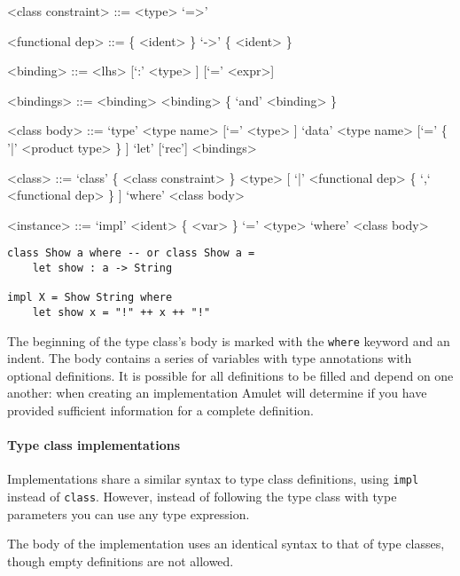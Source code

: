 \begin{grammar}
<class constraint> ::= <type> `=>'

<functional dep>   ::= \{ <ident> \} `->' \{ <ident> \}

<binding>  ::= <lhs> [`:' <type> ] [`=' <expr>]

<bindings> ::= <binding>
          \alt <binding> \{ `and' <binding> \}

<class body> ::= `type' <type name> [`=' <type> ]
            \alt `data' <type name> [`=' \{ '|' <product type> \} ]
            \alt `let' [`rec'] <bindings>

<class>            ::= `class' \{ <class constraint> \} <type> [ `|' <functional dep> \{ `,` <functional dep> \} ] `where' <class body>

<instance>         ::= `impl' <ident> \{ <var> \} `=' <type> `where' <class body>
\end{grammar}

\begin{verbatim}
class Show a where -- or class Show a =
    let show : a -> String

impl X = Show String where
    let show x = "!" ++ x ++ "!"
\end{verbatim}

The beginning of the type class’s body is marked with the \texttt{where} keyword and an indent. The body contains a series of variables with type annotations with optional definitions. It is possible for all definitions to be filled and depend on one another: when creating an implementation Amulet will determine if you have provided sufficient information for a complete definition.

\paragraph{Type class implementations}
Implementations share a similar syntax to type class definitions, using \texttt{impl} instead of \texttt{class}. However, instead of following the type class with type parameters you can use any type expression.

The body of the implementation uses an identical syntax to that of type classes, though empty definitions are not allowed.